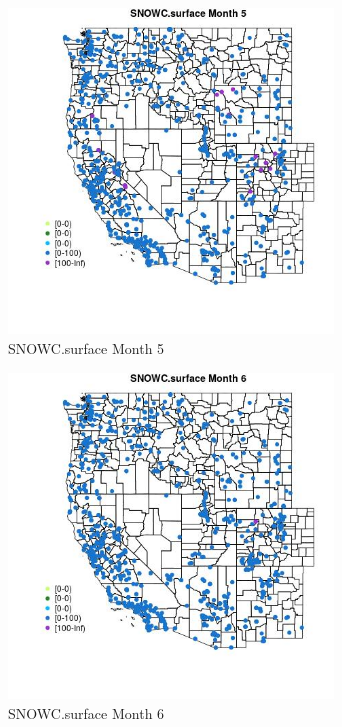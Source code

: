 \begin{figure} 
\centering  
\includegraphics[width=0.77\textwidth]{Code_Outputs/Report_ML_input_PM25_Step4_part_e_de_duplicated_aves_compiled_2019-05-21wNAs_MapObsMo5SNOWCsurface.jpg} 
\caption{\label{fig:Report_ML_input_PM25_Step4_part_e_de_duplicated_aves_compiled_2019-05-21wNAsMapObsMo5SNOWCsurface}SNOWC.surface Month 5} 
\end{figure} 
 

\begin{figure} 
\centering  
\includegraphics[width=0.77\textwidth]{Code_Outputs/Report_ML_input_PM25_Step4_part_e_de_duplicated_aves_compiled_2019-05-21wNAs_MapObsMo6SNOWCsurface.jpg} 
\caption{\label{fig:Report_ML_input_PM25_Step4_part_e_de_duplicated_aves_compiled_2019-05-21wNAsMapObsMo6SNOWCsurface}SNOWC.surface Month 6} 
\end{figure} 
 

